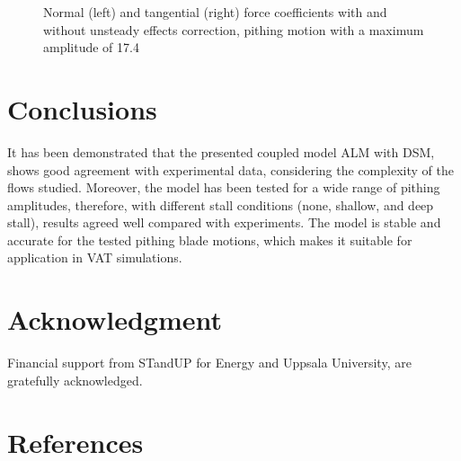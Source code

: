 \documentclass[a4paper]{jpconf}
\begin{document}
\begin{figure}[h]
\begin{minipage}{18pc}
\resizebox{\columnwidth}{!}{}
\end{minipage}\hspace{2pc}%
\begin{minipage}{18pc}
\resizebox{\columnwidth}{!}{}
\end{minipage}
\caption{\label{AMP174corrections}Normal (left) and tangential (right) force coefficients with and without unsteady effects correction, pithing motion with a maximum amplitude of 17.4\degree\ }
\end{figure}


\section{Conclusions}

It has been demonstrated that the presented coupled model ALM with DSM, shows
good agreement with experimental data, considering the complexity of the flows
studied. Moreover, the model has been tested for a wide range of pithing
amplitudes, therefore, with different stall conditions (none, shallow, and deep
stall), results agreed well compared with experiments. The model is stable and
accurate for the tested pithing blade motions, which makes it suitable for
application in VAT simulations.


\section*{Acknowledgment}
Financial support from STandUP for Energy and Uppsala University, are gratefully acknowledged.


\section*{References}

{}

\end{document}
